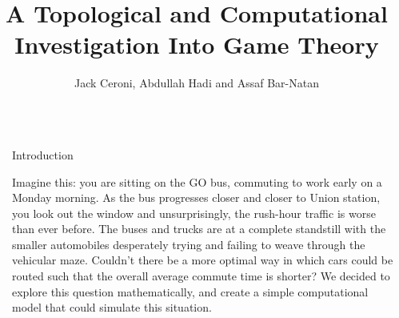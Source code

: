 \documentclass[final]{beamer}
\title{A Topological and Computational Investigation Into Game Theory} %
\author{Jack Ceroni, Abdullah Hadi and Assaf Bar-Natan} %
\institute{University of Toronto Mathematics Mentorship Program} %
\newlength{\sepwid}
\newlength{\onecolwid}
\begin{document}

\setlength{\belowcaptionskip}{2ex} %
\setlength\belowdisplayshortskip{2ex} %

\begin{frame}[t] %

\begin{columns}[t] %

\begin{column}{\sepwid}\end{column} %

\begin{column}{\onecolwid} %





\begin{block}{Introduction}

Imagine this:  you are sitting on the GO bus, commuting to work early on a Monday morning.  As the bus progresses closer and closer to Union station,  you look out the window and unsurprisingly,  the rush-hour traffic is worse than ever before.  The buses and trucks are at a complete standstill with the smaller automobiles desperately trying and failing to weave through the vehicular maze.  Couldn't there be a more optimal way in which cars could be routed such that the overall average commute time is shorter? We decided to explore this question mathematically, and  create a simple computational model that could simulate this situation. 


\end{block}




\end{column}
\end{columns}
\end{frame}
\end{document}
